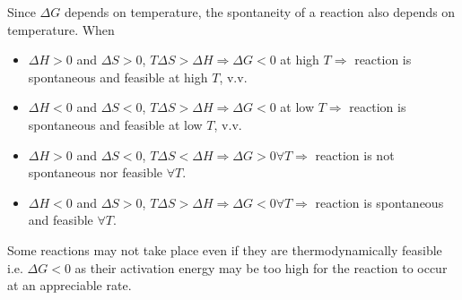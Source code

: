 \documentclass[Chemistry.tex]{subfiles}
\begin{document}
Since \(\Delta G\) depends on temperature, the spontaneity of a reaction also depends on temperature. When
\begin{itemize}
\item \(\Delta H > 0\) and \(\Delta S > 0\), \(T\Delta S > \Delta H \Rightarrow \Delta G < 0\) at high \(T \Rightarrow\) reaction is spontaneous and feasible at high \(T\), v.v.
\item \(\Delta H < 0\) and \(\Delta S < 0\), \(T\Delta S > \Delta H \Rightarrow \Delta G < 0\) at low \(T \Rightarrow\) reaction is spontaneous and feasible at low \(T\), v.v.
\item \(\Delta H > 0\) and \(\Delta S < 0\), \(T\Delta S < \Delta H\Rightarrow \Delta G > 0 \mathrel\forall T \Rightarrow\) reaction is not spontaneous nor feasible \(\mathrel\forall T\).
\item \(\Delta H < 0\) and \(\Delta S > 0\), \(T\Delta S > \Delta H \Rightarrow \Delta G < 0 \mathrel\forall T \Rightarrow\) reaction is spontaneous and feasible \(\mathrel\forall T\).
\end{itemize}

Some reactions may not take place even if they are thermodynamically feasible i.e. \(\Delta G < 0\) as their activation energy may be too high for the reaction to occur at an appreciable rate.
\end{document}
